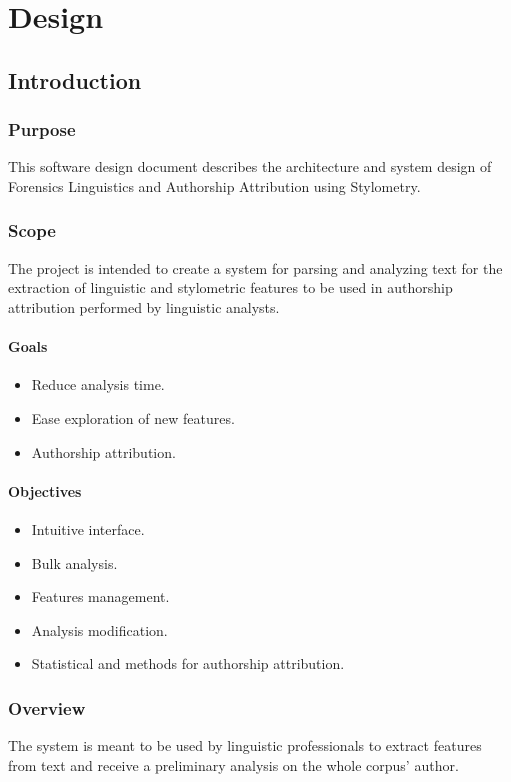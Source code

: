 \chapter{Design}

\section{Introduction}

\subsection{Purpose}
This software design document describes the architecture and system design of Forensics Linguistics and Authorship Attribution using Stylometry.

\subsection{Scope}
The project is intended to create a system for parsing and analyzing text for the extraction of linguistic and stylometric features to be used in authorship attribution performed by linguistic analysts.

\subsubsection{Goals}
\begin{itemize}
    \item Reduce analysis time.
    \item Ease exploration of new features.
    \item Authorship attribution.
\end{itemize}

\subsubsection{Objectives}
\begin{itemize}
    \item Intuitive interface.
    \item Bulk analysis.
    \item Features management.
    \item Analysis modification.
    \item Statistical and methods for authorship attribution.
\end{itemize}

\subsection{Overview}
The system is meant to be used by linguistic professionals to extract features from text and receive a preliminary analysis on the whole corpus' author.

